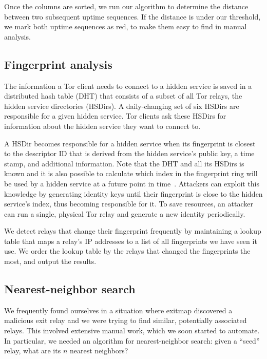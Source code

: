 Once the columns are sorted, we run our algorithm to determine the distance
between two subsequent uptime sequences.  If the distance is under our
threshold, we mark both uptime sequences as red, to make them easy to find in
manual analysis.

\subsection{Fingerprint analysis}
\label{sec:fingerprint-analysis}
The information a Tor client needs to connect to a hidden service is saved in
a distributed hash table (DHT) that consists of a subset of all Tor relays, the
hidden service directories (HSDirs).  A daily-changing set of six HSDirs are
responsible for a given hidden service.  Tor clients ask these HSDirs for
information about the hidden service they want to connect to.

A HSDir becomes responsible for a hidden service when its fingerprint
is closest to the descriptor ID that is derived from the hidden service's public
key, a time stamp, and additional information.
Note that the DHT and all its HSDirs is known and it is also possible to
calculate which index in the fingerprint ring will be used by a hidden service
at a future point in time~\cite{Biryukov2013a}.  Attackers can exploit this
knowledge by generating identity keys until their fingerprint is close to the
hidden service's index, thus becoming responsible for it.  To save resources,
an attacker can run a single, physical Tor relay and generate a new identity
periodically.

We detect relays that change their fingerprint frequently by maintaining a
lookup table that maps a relay's IP addresses to a list of all fingerprints we
have seen it use.  We order the lookup table by the relays that changed the
fingerprints the most, and output the results.


\subsection{Nearest-neighbor search}
\label{sec:nearest-neighbor}
We frequently found ourselves in a situation where exitmap discovered a
malicious exit relay and we were trying to find similar, potentially associated
relays.  This involved extensive manual work, which we soon started to automate.
In particular, we needed an algorithm for nearest-neighbor search: given a
``seed'' relay, what are its $n$ nearest neighbors?

